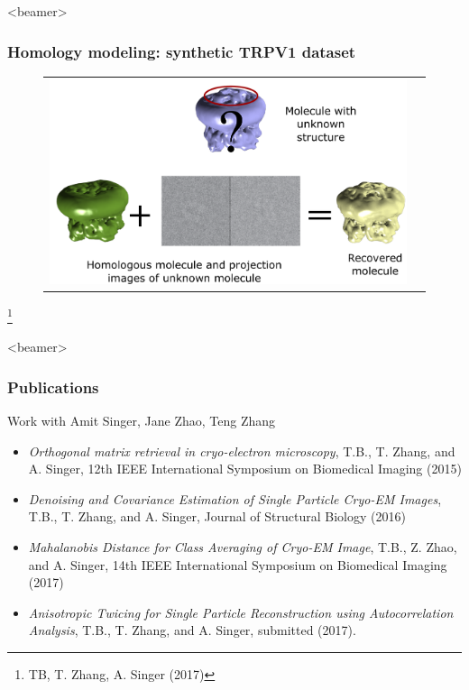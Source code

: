 \documentclass{beamer}
\newcommand\blfootnote[1]{%
  \begingroup
  \renewcommand\thefootnote{}\footnote{#1}%
  \addtocounter{footnote}{-1}%
  \endgroup
}
\begin{document}
\begin{frame}<beamer>
\frametitle{Homology modeling: synthetic TRPV1 dataset}
\begin{figure}[!htbp]
\begin{tabular}{cc}
\includegraphics[width=0.95\linewidth]{figures/trpv1_flowchart.pdf}\label{fig:simtrpv_emdb}
\end{tabular}
\end{figure}\blfootnote{TB, T. Zhang, A. Singer (2017)}
\end{frame}

\begin{frame}<beamer>
\frametitle{Publications}
Work with Amit Singer, Jane Zhao, Teng Zhang\\
\begin{itemize}
\item \tiny{\textit{Orthogonal matrix retrieval in cryo-electron microscopy}, T.B., T. Zhang, and A. Singer, 12th IEEE International Symposium on Biomedical Imaging (2015)}

\item \tiny{\textit{Denoising and Covariance Estimation of Single Particle Cryo-EM Images}, T.B., T. Zhang, and A. Singer, Journal of Structural Biology (2016)}

\item \textit{Mahalanobis Distance for Class Averaging of Cryo-EM Image}, T.B., Z. Zhao, and A. Singer, 14th IEEE International Symposium on Biomedical Imaging (2017)

\item \textit{Anisotropic Twicing for Single Particle Reconstruction using Autocorrelation Analysis}, T.B., T. Zhang, and A. Singer, submitted (2017).

\end{itemize}
\end{frame}
\end{document}
